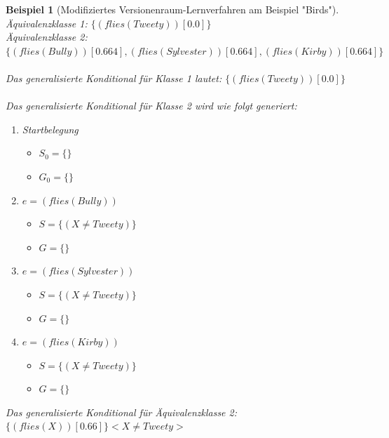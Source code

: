 \documentclass[a4paper, 11pt]{book}
\newtheorem{Bsp}{Beispiel}[section]
\begin{document}
\begin{Bsp}[Modifiziertes Versionenraum-Lernverfahren am Beispiel "{}Birds"{}]
\noindent
Äquivalenzklasse 1: $\{(flies(Tweety))[0.0]\}$\\
Äquivalenzklasse 2: $\{(flies(Bully))[0.664], (flies(Sylvester))[0.664], (flies(Kirby))[0.664]\}$\\
\\
Das generalisierte Konditional für Klasse 1 lautet: $\{(flies(Tweety))[0.0]\}$\\
\\
Das generalisierte Konditional für Klasse 2 wird wie folgt generiert:

\begin{enumerate}
	\item Startbelegung
	\begin{itemize}
		\item $ S_0 = \{\}$ 
		\item $ G_0 = \{\} $
	\end{itemize}
	\item $ e = (flies(Bully)) $
	\begin{itemize}
		\item $ S = \{(X \neq Tweety)\}$ 
		\item $ G = \{\} $
	\end{itemize}
	\item $ e = (flies(Sylvester)) $
	\begin{itemize}
		\item $ S = \{(X \neq Tweety)\}$ 
		\item $ G = \{\} $
	\end{itemize}
		\item $ e = (flies(Kirby)) $
	\begin{itemize}
		\item $ S = \{(X \neq Tweety)\}$ 
		\item $ G = \{\} $
	\end{itemize}	
\end{enumerate}
Das generalisierte Konditional für Äquivalenzklasse 2: $\{(flies(X))[0.66]\} <X \neq Tweety>$\\
\end{Bsp}
\end{document}
